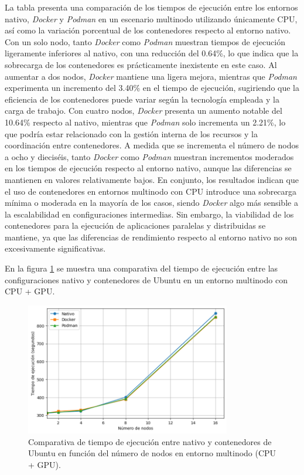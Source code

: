 La tabla presenta una comparación de los tiempos de ejecución entre los entornos nativo, \textit{Docker} y \textit{Podman} en un escenario multinodo utilizando únicamente CPU, así como la variación porcentual de los contenedores respecto al entorno nativo. Con un solo nodo, tanto \textit{Docker} como \textit{Podman} muestran tiempos de ejecución ligeramente inferiores al nativo, con una reducción del 0.64\%, lo que indica que la sobrecarga de los contenedores es prácticamente inexistente en este caso. Al aumentar a dos nodos, \textit{Docker} mantiene una ligera mejora, mientras que \textit{Podman} experimenta un incremento del 3.40\% en el tiempo de ejecución, sugiriendo que la eficiencia de los contenedores puede variar según la tecnología empleada y la carga de trabajo. Con cuatro nodos, \textit{Docker} presenta un aumento notable del 10.64\% respecto al nativo, mientras que \textit{Podman} solo incrementa un 2.21\%, lo que podría estar relacionado con la gestión interna de los recursos y la coordinación entre contenedores. A medida que se incrementa el número de nodos a ocho y dieciséis, tanto \textit{Docker} como \textit{Podman} muestran incrementos moderados en los tiempos de ejecución respecto al entorno nativo, aunque las diferencias se mantienen en valores relativamente bajos. En conjunto, los resultados indican que el uso de contenedores en entornos multinodo con CPU introduce una sobrecarga mínima o moderada en la mayoría de los casos, siendo \textit{Docker} algo más sensible a la escalabilidad en configuraciones intermedias. Sin embargo, la viabilidad de los contenedores para la ejecución de aplicaciones paralelas y distribuidas se mantiene, ya que las diferencias de rendimiento respecto al entorno nativo no son excesivamente significativas.

En la figura \ref{fig:multi-node_ubuntu_container_vs_native_gpu_time} se muestra una comparativa del tiempo de ejecución entre las configuraciones nativo y contenedores de Ubuntu en un entorno multinodo con CPU + GPU.

\begin{figure}[H]
    \centering
    \includegraphics[width=0.8\textwidth]{imagenes/cap5/multi-node_ubuntu_container_vs_native_gpu_time.png}
    \caption{Comparativa de tiempo de ejecución entre nativo y contenedores de Ubuntu en función del número de nodos en entorno multinodo (CPU + GPU).}
    \label{fig:multi-node_ubuntu_container_vs_native_gpu_time}
\end{figure}

